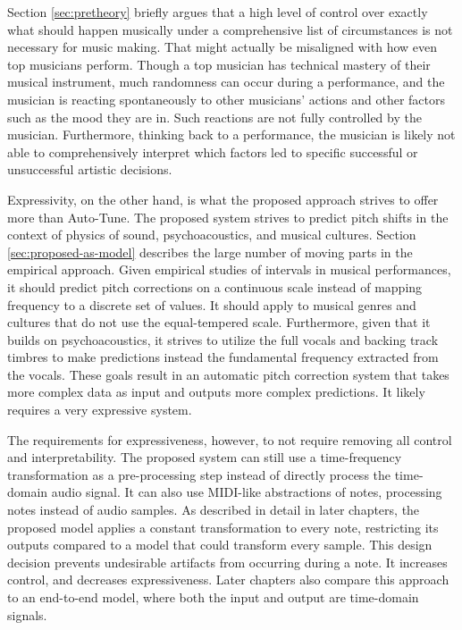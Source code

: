 Section \ref{sec:pretheory} briefly argues that a high level of control over exactly what should happen musically under a comprehensive list of circumstances is not necessary for music making. That might actually be misaligned with how even top musicians perform. Though a top musician has technical mastery of their musical instrument, much randomness can occur during a performance, and the musician is reacting spontaneously to other musicians' actions and other factors such as the mood they are in. Such reactions are not fully controlled by the musician. Furthermore, thinking back to a performance, the musician is likely not able to comprehensively interpret which factors led to specific successful or unsuccessful artistic decisions. 

Expressivity, on the other hand, is what the proposed approach strives to offer more than Auto-Tune. The proposed system strives to predict pitch shifts in the context of physics of sound, psychoacoustics, and musical cultures. Section \ref{sec:proposed-as-model} describes the large number of moving parts in the empirical approach. Given empirical studies of intervals in musical performances, it should predict pitch corrections on a continuous scale instead of mapping frequency to a discrete set of values. It should apply to musical genres and cultures that do not use the equal-tempered scale. Furthermore, given that it builds on psychoacoustics, it strives to utilize the full vocals and backing track timbres to make predictions instead the fundamental frequency extracted from the vocals. These goals result in an automatic pitch correction system that takes more complex data as input and outputs more complex predictions. It likely requires a very expressive system.

The requirements for expressiveness, however, to not require removing all control and interpretability. The proposed system can still use a time-frequency transformation as a pre-processing step instead of directly process the time-domain audio signal. It can also use MIDI-like abstractions of notes, processing notes instead of audio samples. As described in detail in later chapters, the proposed model applies a constant transformation to every note, restricting its outputs compared to a model that could transform every sample. This design decision prevents undesirable artifacts from occurring during a note. It increases control, and decreases expressiveness. Later chapters also compare this approach to an end-to-end model, where both the input and output are time-domain signals. 

